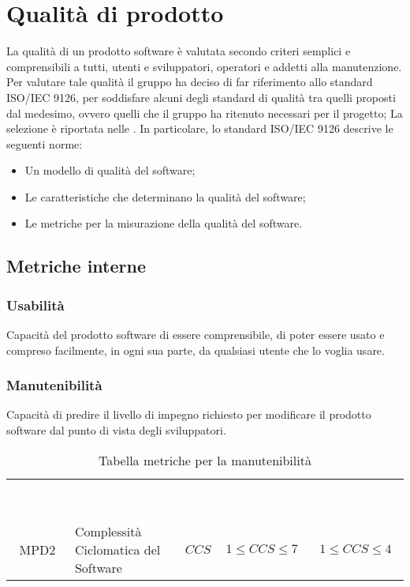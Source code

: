 \section{Qualità di prodotto}
La qualità di un prodotto software è valutata secondo criteri semplici e comprensibili a tutti, utenti e sviluppatori, operatori e addetti alla manutenzione.
Per valutare tale qualità il gruppo \Gruppo{} ha deciso di far riferimento allo standard ISO/IEC 9126, per soddisfare alcuni degli standard di qualità tra quelli proposti dal medesimo, ovvero quelli che il gruppo ha ritenuto necessari per il progetto; La selezione è riportata nelle \NdP{}. In particolare, lo standard ISO/IEC 9126 descrive le seguenti norme:
\begin{itemize}
    \item Un modello di qualità del software; 
    \item Le caratteristiche che determinano la qualità del software;
    \item Le metriche per la misurazione della qualità del software.
\end{itemize}

\subsection{Metriche interne}
\subsubsection{Usabilità} 
Capacità del prodotto software di essere comprensibile, di poter essere usato e compreso facilmente, in ogni sua parte, da qualsiasi utente che lo voglia usare.\\
\vspace{0.3cm}
\subsubsection{Manutenibilità} 
Capacità di predire il livello di impegno richiesto per modificare il prodotto software dal punto di vista degli sviluppatori.           
\begin{longtable}{ c C{4cm} c C{3.5cm} C{3.5cm}}
	\caption{Tabella metriche per la manutenibilità}\\
	\textcolor{white}{\textbf{Metrica}} & \textcolor{white}{\textbf{Nome}} & \textcolor{white}{\textbf{Sigla}} & \textcolor{white}{\textbf{Range Accettabile}} & \textcolor{white}{\textbf{Range Ottimale}}\\
	MPD2 & Complessità Ciclomatica del Software & $CCS $ & $1 \leq CCS \leq 7 $ & $1 \leq CCS \leq 4$\\
\end{longtable} 
